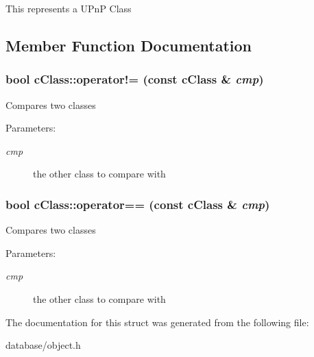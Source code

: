 This represents a UPnP Class 

\subsection{Member Function Documentation}
\hypertarget{structcClass_1de09f337ef261d363f261f83a3cf7ae}{
\subsubsection[{operator!=}]{\setlength{\rightskip}{0pt plus 5cm}bool cClass::operator!= (const {\bf cClass} \& {\em cmp})}}
\label{structcClass_1de09f337ef261d363f261f83a3cf7ae}


Compares two classes

\begin{Desc}
\item[Parameters:]
\begin{description}
\item[{\em cmp}]the other class to compare with \end{description}
\end{Desc}
 \hypertarget{structcClass_22a5df5fd2bfc9e7b58018a6b8d45309}{
\subsubsection[{operator==}]{\setlength{\rightskip}{0pt plus 5cm}bool cClass::operator== (const {\bf cClass} \& {\em cmp})}}
\label{structcClass_22a5df5fd2bfc9e7b58018a6b8d45309}


Compares two classes

\begin{Desc}
\item[Parameters:]
\begin{description}
\item[{\em cmp}]the other class to compare with \end{description}
\end{Desc}


The documentation for this struct was generated from the following file:\begin{CompactItemize}
\item 
database/object.h\end{CompactItemize}

